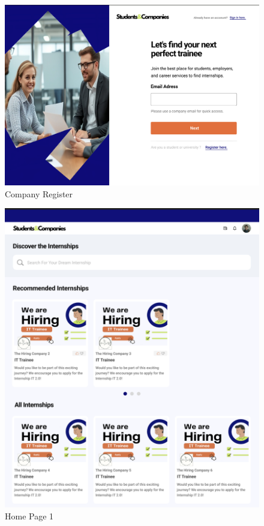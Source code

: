 \documentclass{article}
\begin{document}
\begin{figure}[H]
    \centering
    \includegraphics[scale = 0.40]{figures/UserInterfaces/Employer Register.png}
    \caption{Company Register}
     \centering
\end{figure}
    \begin{figure}[H]
    \centering
    \includegraphics[scale = 0.40]{figures/UserInterfaces/HomePage1.png}
    \caption{Home Page 1}
     \centering
\end{figure}
\end{document}
